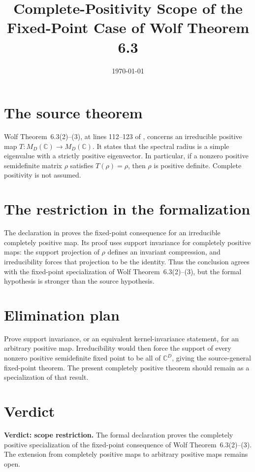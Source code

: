 \documentclass[11pt]{article}
\title{Complete-Positivity Scope of the Fixed-Point Case of Wolf Theorem 6.3}
\author{}
\date{\today}
\begin{document}
\maketitle
{}

\section{The source theorem}

Wolf Theorem~6.3(2)--(3), at lines 112--123 of
, concerns an irreducible positive
map $T:M_D(\mathbb C)\to M_D(\mathbb C)$. It states that the spectral radius is
a simple eigenvalue with a strictly positive eigenvector. In particular, if a
nonzero positive semidefinite matrix $\rho$ satisfies $T(\rho)=\rho$, then
$\rho$ is positive definite. Complete positivity is not assumed.

\section{The restriction in the formalization}

The declaration
 in
 proves the fixed-point
consequence for an irreducible completely positive map. Its proof uses support
invariance for completely positive maps: the support projection of $\rho$
defines an invariant compression, and irreducibility forces that projection to
be the identity. Thus the conclusion agrees with the fixed-point specialization
of Wolf Theorem~6.3(2)--(3), but the formal hypothesis is stronger than the source
hypothesis.

\section{Elimination plan}

Prove support invariance, or an equivalent kernel-invariance statement, for an
arbitrary positive map. Irreducibility would then force the support of every
nonzero positive semidefinite fixed point to be all of $\mathbb C^D$, giving the
source-general fixed-point theorem. The present completely positive theorem
should remain as a specialization of that result.

\section{Verdict}

\textbf{Verdict: scope restriction.} The formal declaration proves the
completely positive specialization of the fixed-point consequence of Wolf
Theorem~6.3(2)--(3). The extension from completely positive maps to arbitrary
positive maps remains open.
\end{document}
